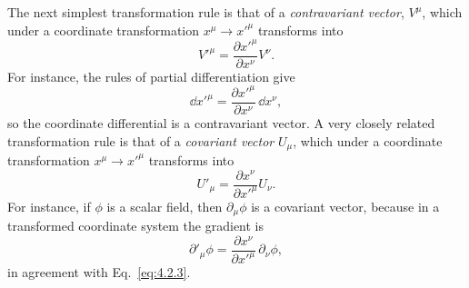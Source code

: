 The next simplest transformation rule is that of a \textit{contravariant
vector}, \(V^\mu\), which under a coordinate transformation
\(x^\mu\to x'^\mu\) transforms into
\begin{equation}
  V'^\mu
  =\frac{\partial x'^\mu}{\partial x^\nu}V^\nu .
  \tag{4.2.1}\label{eq:4.2.1}
\end{equation}
For instance, the rules of partial differentiation give
\begin{equation}
  \dd x'^\mu
  =\frac{\partial x'^\mu}{\partial x^\nu}\,\dd x^\nu ,
  \tag{4.2.2}\label{eq:4.2.2}
\end{equation}
so the coordinate differential is a contravariant vector. A very closely
related transformation rule is that of a \textit{covariant vector} \(U_\mu\),
which under a coordinate transformation \(x^\mu\to x'^\mu\) transforms into
\begin{equation}
  U'_\mu
  =\frac{\partial x^\nu}{\partial x'^\mu}U_\nu .
  \tag{4.2.3}\label{eq:4.2.3}
\end{equation}
For instance, if \(\phi\) is a scalar field, then \(\partial_\mu\phi\) is a
covariant vector, because in a transformed coordinate system the gradient is
\begin{equation}
  \partial'_\mu\phi
  =\frac{\partial x^\nu}{\partial x'^\mu}\,\partial_\nu\phi ,
  \tag{4.2.4}\label{eq:4.2.4}
\end{equation}
in agreement with Eq.~\eqref{eq:4.2.3}.

